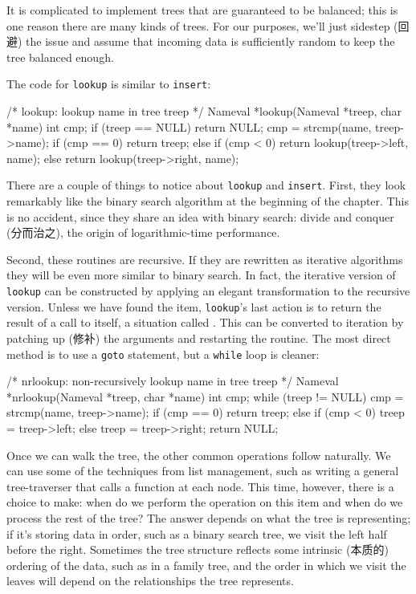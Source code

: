 It is complicated to implement trees that are guaranteed to be balanced;
this is one reason there are many kinds of trees. For our purposes, we'll
just sidestep (回避) the issue and assume that incoming data is
sufficiently random to keep the tree balanced enough.

The code for \verb'lookup' is similar to \verb'insert':
\begin{wellcode}
    /* lookup: lookup name in tree treep */
    Nameval *lookup(Nameval *treep, char *name)
    {
        int cmp;
        if (treep == NULL)
            return NULL;
        cmp = strcmp(name, treep->name);
        if (cmp == 0)
            return treep;
        else if (cmp < 0)
            return lookup(treep->left, name);
        else
            return lookup(treep->right, name);
    }
\end{wellcode}

There are a couple of things to notice about \verb'lookup' and
\verb'insert'. First, they look remarkably like the binary search algorithm
at the beginning of the chapter. This is no accident, since they share an
idea with binary search: divide and conquer (分而治之), the origin of
logarithmic-time performance.

Second, these routines are recursive. If they are rewritten as iterative
algorithms they will be even more similar to binary search. In fact, the
iterative version of \verb'lookup' can be constructed by applying an
elegant transformation to the recursive version. Unless we have found the
item, \verb'lookup''s last action is to return the result of a call to
itself, a situation called . This can be converted to
iteration by patching up (修补) the arguments and restarting the routine.
The most direct method is to use a \verb'goto' statement, but a
\verb'while' loop is cleaner:
\begin{wellcode}
    /* nrlookup: non-recursively lookup name in tree treep */
    Nameval *nrlookup(Nameval *treep, char *name)
    {
        int cmp;
        while (treep != NULL) {
            cmp = strcmp(name, treep->name);
            if (cmp == 0)
                return treep;
            else if (cmp < 0)
                treep = treep->left;
            else
                treep = treep->right;
        }
        return NULL;
    }
\end{wellcode}

Once we can walk the tree, the other common operations follow naturally. We
can use some of the techniques from list management, such as writing a
general tree-traverser that calls a function at each node. This time,
however, there is a choice to make: when do we perform the operation on
this item and when do we process the rest of the tree? The answer depends
on what the tree is representing; if it's storing data in order, such as a
binary search tree, we visit the left half before the right. Sometimes the
tree structure reflects some intrinsic (本质的) ordering of the data, such
as in a family tree, and the order in which we visit the leaves will depend
on the relationships the tree represents.


